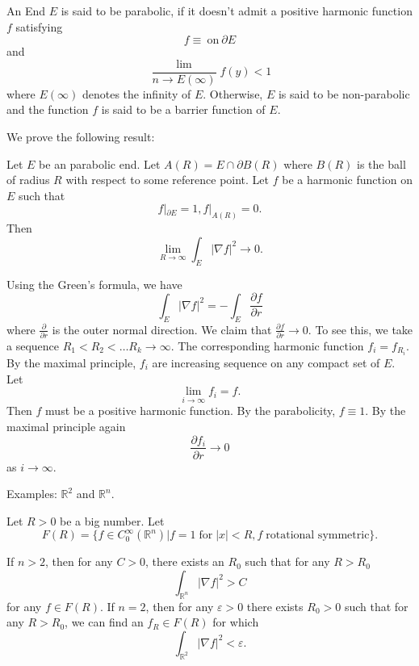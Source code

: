 \begin{definition} An End $E$ is said to be parabolic, if it doesn't admit a positive harmonic function $f$ satisfying 
%
\[ f \equiv  \ \mbox{on} \ \partial E\]
and
\[ \frac{\lim}{n\rightarrow E (\infty)} f(y) <  1 \]
where $ E(\infty)$ denotes the infinity of $E$. Otherwise, $E$ is said to be non-parabolic and the function $f$ is said to be a barrier function of $E$.

We prove the following result:
\end{definition}

\begin{theorem} Let $E$ be an parabolic end. Let $ A(R) = E \cap \partial B(R) $ where $ B(R)$ is the ball of radius $R$ with respect to some reference point. Let $f$ be a harmonic function on $E$ such that 
%
\[ f|_{\partial E} = 1 , f | _{A(R) } = 0 .\]
%
Then 
%
\[ \lim_{R\rightarrow \infty} \int_E |\nabla f|^2 \rightarrow 0. \]
\end{theorem}

Using the Green's formula, we have 
%
\[\int _E |\nabla f|^2 = - \int _E \frac{\partial f}{\partial r}  \]
%
where $\frac{\partial }{\partial r} $ is the outer  normal direction. We claim that $ \frac{\partial f}{\partial r} \rightarrow 0$.
To see this, we take a sequence $ R_1 < R_2 < \ldots R_k \rightarrow \infty$. The corresponding harmonic function $f_i = f_{R_{i}}$. By the maximal principle, $f_i$ are increasing sequence on any compact set of $E$. Let 
%
\[ \lim_{i \rightarrow \infty} f_i = f. \]
%
Then $f$ must be a positive harmonic function. By the parabolicity, $f \equiv 1$. By the maximal principle again 
%
\[ \frac{\partial f_i}{\partial r} \rightarrow 0\]
%
as $ i \rightarrow \infty$.

\noindent Examples: $ \mathbb{R}^2 $ and $ \mathbb{R}^n $.

Let $ R > 0 $ be a big number. Let 
\[F(R) = \{ f \in C^\infty _0 (\mathbb{R}^n) | f = 1 \; \mbox{for}\; |x| < R, f \; \mbox{rotational symmetric} \}.\]

If $n > 2 $, then for any $ C > 0 $, there exists an $R_0$ such that for any $ R > R_0 $
%
\[ \int_{\mathbb{R}^n}|\nabla f | ^2 > C \]
%
for any $ f \in F(R) $. If $ n = 2 $, then for any $ \varepsilon > 0 $ there exists $ R_0 > 0 $ such that for any $ R> R_0 $, we can find an $ f_R \in F(R) $ for which 
%
\[ \int_{\mathbb{R}^2} | \nabla f|^2 < 
\varepsilon.\]

